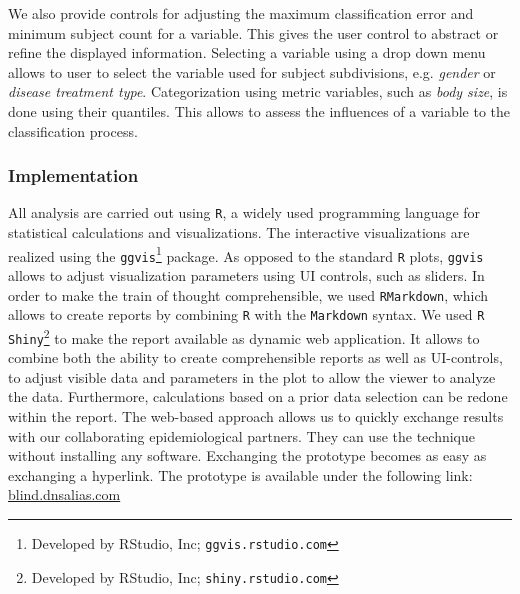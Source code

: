 \documentclass[a4paper,twoside]{style/article}
\begin{document}
We also provide controls for adjusting the maximum classification error and minimum subject count for a variable.
This gives the user control to abstract or refine the displayed information.
Selecting a variable using a drop down menu allows to user to select the variable used for subject subdivisions, e.g. \emph{gender} or \emph{disease treatment type}.
Categorization using metric variables, such as \emph{body size}, is done using their quantiles.
This allows to assess the influences of a variable to the classification process.
\subsubsection{Implementation}
All analysis are carried out using \texttt{R}, a widely used programming language for statistical calculations and visualizations.
The interactive visualizations are realized using the \texttt{ggvis}\footnote{Developed by RStudio, Inc; \texttt{ggvis.rstudio.com}} package.
As opposed to the standard \texttt{R} plots, \texttt{ggvis} allows to adjust visualization parameters using UI controls, such as sliders.
In order to make the train of thought comprehensible, we used \texttt{RMarkdown}, which allows to create reports by combining \texttt{R} with the \texttt{Markdown} syntax.
We used \texttt{R Shiny}\footnote{Developed by RStudio, Inc; \texttt{shiny.rstudio.com}} to make the report available as dynamic web application.
It allows to combine both the ability to create comprehensible reports as well as UI-controls, to adjust visible data and parameters in the plot to allow the viewer to analyze the data.
Furthermore, calculations based on a prior data selection can be redone within the report.
The web-based approach allows us to quickly exchange results with our collaborating epidemiological partners.
They can use the technique without installing any software.
Exchanging the prototype becomes as easy as exchanging a hyperlink.
The prototype is available under the following link: \url{blind.dnsalias.com}
\end{document}

